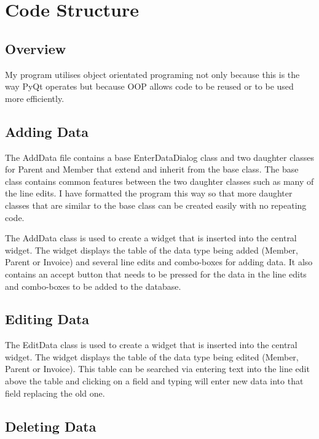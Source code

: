 \section{Code Structure}

\subsection{Overview}
My program utilises object orientated programing not only because this is the way PyQt operates but because OOP allows code to be reused or to be used more efficiently.


\subsection{Adding Data}


The AddData file contains a base EnterDataDialog class and two daughter classes for Parent and Member that extend and inherit from the base class. The base class contains common features between the two daughter classes such as many of the line edits. I have formatted the program this way so that more daughter classes that are similar to the base class can be created easily with no repeating code.

The AddData class is used to create a widget that is inserted into the central widget. The widget displays the table of the data type being added (Member, Parent or Invoice) and several line edits and combo-boxes for adding data. It also contains an accept button that needs to be pressed for the data in the line edits and combo-boxes to be added to the database. 


\subsection{Editing Data}


The EditData class is used to create a widget that is inserted into the central widget. The widget displays the table of the data type being edited (Member, Parent or Invoice). This table can be searched via entering text into the line edit above the table and clicking on a field and typing will enter new data into that field replacing the old one.


\subsection{Deleting Data}

